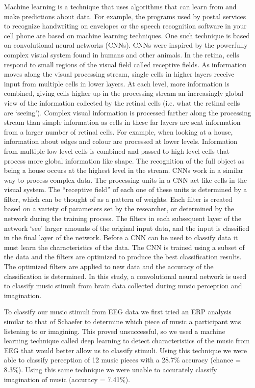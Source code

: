 Machine learning is a technique that uses algorithms that can learn from and make predictions about data.
For example, the programs used by postal services to recognize handwriting on envelopes or the speech recognition software in your cell phone are based on machine learning techniques.
One such technique is based on convolutional neural networks (\acp{CNN}).
\acp{CNN} were inspired by the powerfully complex visual system found in humans and other animals.
In the retina, cells respond to small regions of the visual field \cite{hubel_receptive_1963} called receptive fields. 
As information moves along the visual processing stream, single cells in higher layers receive input from multiple cells in lower layers.
At each level, more information is combined, giving cells higher up in the processing stream an increasingly global view of the information collected by the retinal cells (i.e. what the retinal cells are `seeing').
Complex visual information is processed farther along the processing stream than simple information as cells in these far layers are sent information from a larger number of retinal cells.
For example, when looking at a house, information about edges and colour are processed at lower levels.
Information from multiple low-level cells is combined and passed to high-level cells that process more global information like shape. 
The recognition of the full object as being a house occurs at the highest level in the stream. 
\acp{CNN} work in a similar way to process complex data. 
The processing units in a \ac{CNN} act like cells in the visual system.
The ``receptive field'' of each one of these units is determined by a filter, which can be thought of as a pattern of weights.
Each filter is created based on a variety of parameters set by the researcher, or determined by the network during the training process.
The filters in each subsequent layer of the network `see' larger amounts of the original input data, and the input is classified in the final layer of the network. 
Before a \ac{CNN} can be used to classify data it must learn the characteristics of the data. 
The \ac{CNN} is trained using a subset of the data and the filters are optimized to produce the best classification results. 
The optimized filters are applied to new data and the accuracy of the classification is determined. 
In this study, a convolutional neural network is used to classify music stimuli from brain data collected during music perception and imagination. 

To classify our music stimuli from EEG data we first tried an ERP analysis similar to that of Schaefer \etal\citeyear{schaefer_name_2011} to determine which piece of music a participant was listening to or imagining.
This proved unsuccessful, so we used a machine learning technique called deep learning to detect characteristics of the music from EEG that would better allow us to classify stimuli.
Using this technique we were able to classify perception of 12 music pieces with a 28.7\% accuracy (chance = 8.3\%).
Using this same technique we were unable to accurately classify imagination of music (accuracy = 7.41\%). 